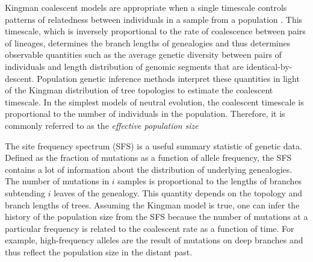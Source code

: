 \documentclass[11pt, letterpaper]{article}   	%
\begin{document}
Kingman coalescent models are appropriate when a single timescale controls patterns of relatedness between individuals in a sample from a population .
This timescale, which is inversely proportional to the rate of coalescence between pairs of lineages, determines the branch lengths of genealogies and thus determines observable quantities such as the average genetic diversity between pairs of individuals and length distribution of genomic segments that are identical-by-descent.
Population genetic inference methods interpret these quantities in light of the Kingman distribution of tree topologies to estimate the coalescent timescale.
In the simplest models of neutral evolution, the coalescent timescale is proportional to the number of individuals in the population. Therefore, it is commonly referred to as the \emph{effective population size}



The site frequency spectrum (SFS) is a useful summary statistic of genetic data. Defined as the fraction of mutations as a function of allele frequency, the SFS contains a lot of information about the distribution of underlying genealogies. The number of mutations in $i$ samples is proportional to the lengths of branches subtending $i$ leaves of the genealogy. This quantity depends on the topology and branch lengths of trees. Assuming the Kingman model is true, one can infer the history of the population size from the SFS because the number of mutations at a particular frequency is related to the coalescent rate as a function of time. For example, high-frequency alleles are the result of mutations on deep branches and thus reflect the population size in the distant past. 
\end{document}
